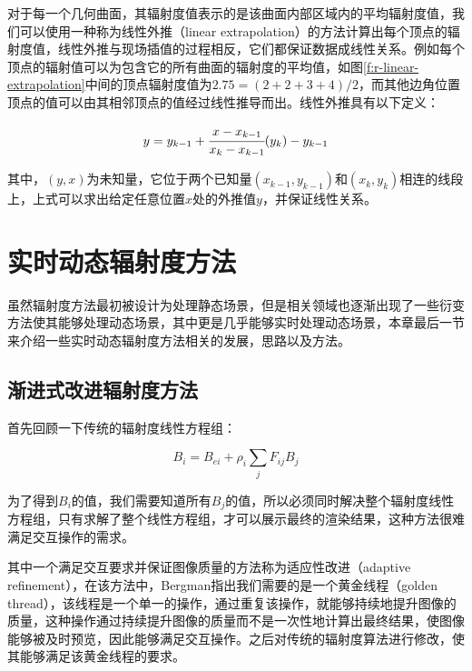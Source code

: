 对于每一个几何曲面，其辐射度值表示的是该曲面内部区域内的平均辐射度值，我们可以使用一种称为线性外推（linear extrapolation）的方法计算出每个顶点的辐射度值，线性外推与现场插值的过程相反，它们都保证数据成线性关系。例如每个顶点的辐射值可以为包含它的所有曲面的辐射度的平均值，如图\ref{f:r-linear-extrapolation}中间的顶点辐射度值为$2.75=(2+2+3+4)/2$，而其他边角位置顶点的值可以由其相邻顶点的值经过线性推导而出。线性外推具有以下定义：

\begin{equation}
	y=y_{k-1}+ \cfrac{x-x_{k-1}}{x_k-x_{k-1}}(y_k)-y_{k-1}
\end{equation}

\noindent 其中，$(y,x)$为未知量，它位于两个已知量$(x_{k-1},y_{k-1})$和$(x_k,y_k)$相连的线段上，上式可以求出给定任意位置$x$处的外推值$y$，并保证线性关系。






\section{实时动态辐射度方法}\label{sec:r-dynamic-radiosity}
虽然辐射度方法最初被设计为处理静态场景，但是相关领域也逐渐出现了一些衍变方法使其能够处理动态场景，其中\cite{a:Real-TimeDynamicRadiosityforHighQualityGlobalIllumination}更是几乎能够实时处理动态场景，本章最后一节来介绍一些实时动态辐射度方法相关的发展，思路以及方法。




\subsection{渐进式改进辐射度方法}\label{sec:r-progressive refinement-adiosity}
首先回顾一下传统的辐射度线性方程组：

\begin{equation}\label{e:r-gathering}
	B_i=B_{ei}+\rho_i \sum_j F_{ij} B_j
\end{equation}

\noindent 为了得到$B_i$的值，我们需要知道所有$B_j$的值，所以必须同时解决整个辐射度线性方程组，只有求解了整个线性方程组，才可以展示最终的渲染结果，这种方法很难满足交互操作的需求。

其中一个满足交互要求并保证图像质量的方法称为适应性改进（adaptive refinement）\cite{a:ImageRenderingbyAdaptiveRefinement}，在该方法中，Bergman指出我们需要的是一个黄金线程（golden thread），该线程是一个单一的操作，通过重复该操作，就能够持续地提升图像的质量，这种操作通过持续提升图像的质量而不是一次性地计算出最终结果，使图像能够被及时预览，因此能够满足交互操作。之后\cite{a:AProgressiveRefinementApproachtoFastRadiosityImageGeneration}对传统的辐射度算法进行修改，使其能够满足该黄金线程的要求。

